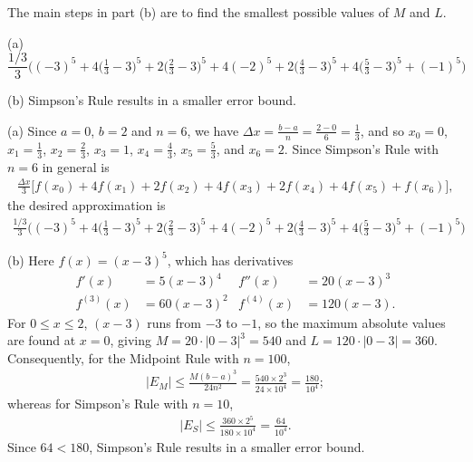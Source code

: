 \begin{hint}
The main steps in part (b) are to find the smallest possible values of
$M$ and $L$.
\end{hint}

\begin{answer}
(a) $\dfrac{1/3}3 \Big( (-3)^5 + 4\Big( \frac13-3 \Big)^5 + 2\Big( \frac23-3 \Big)^5 + 4(-2)^5 + 2\Big( \frac43-3 \Big)^5 + 4\Big( \frac53-3 \Big)^5 + (-1)^5 \Big)$

\noindent (b)
Simpson's Rule results in a smaller error bound.
\end{answer}

\begin{solution} (a)
Since $a=0$, $b=2$ and $n=6$, we have
   $\Delta x=\frac{b-a}{n}=\frac{2-0}6 = \frac{1}{3}$,
and so $x_0=0$, $x_1=\frac{1}{3}$, $x_2=\frac{2}{3}$, $x_3=1$,
$x_4=\frac{4}{3}$, $x_5=\frac{5}{3}$, and $x_6=2$. Since Simpson's
Rule with $n=6$ in general is
\begin{align*}
\frac{\Delta x}3 \big[ f(x_0) + 4f(x_1) + 2f(x_2) + 4f(x_3) + 2f(x_4) + 4f(x_5) + f(x_6) \big],
\end{align*}
the desired approximation is
\begin{align*}
\frac{1/3}3 \bigg( (-3)^5 + 4\Big( \frac13-3 \Big)^5 + 2\Big( \frac23-3 \Big)^5 + 4(-2)^5 + 2\Big( \frac43-3 \Big)^5 + 4\Big( \frac53-3 \Big)^5 + (-1)^5 \bigg)
\end{align*}

\noindent (b)
Here $f(x) = (x-3)^5$, which has derivatives
\begin{align*}
f'(x) &= 5(x-3)^4 & f''(x) &= 20(x-3)^3 \\
f^{(3)}(x) &= 60(x-3)^2 & f^{(4)}(x) &= 120(x-3).
\end{align*}
For $0\le x\le 2$, $(x-3)$ runs from $-3$ to $-1$, so the maximum
absolute values are found at $x=0$, giving
$M= 20\cdot|0-3|^3=540$ and $L=120\cdot|0-3|=360$. Consequently, for
the Midpoint Rule with $n=100$,
\begin{align*}
|E_M| \le \frac{M(b-a)^3}{24n^2} = \frac{540 \times 2^3}{24 \times 10^4} = \frac{180}{10^4};
\end{align*}
whereas for Simpson's Rule with $n=10$,
\begin{align*}
|E_S| \le \frac{360 \times 2^5 }{180 \times 10^4}  = \frac{64}{10^4}.
\end{align*}
Since $64<180$, Simpson's Rule results in a smaller error bound.

\end{solution}


